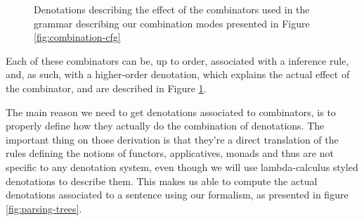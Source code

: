 \begin{figure}
	\centering
	
	\caption{Denotations describing the effect of the combinators used in the
		grammar describing our combination modes presented in
		Figure \ref{fig:combination-cfg}}
	\label{fig:combinator-denotations}
\end{figure}

Each of these combinators can be, up to order, associated with a inference
rule, and, as such, with a higher-order denotation, which explains the actual
effect of the combinator, and are described in
Figure \ref{fig:combinator-denotations}.


The main reason we need to get denotations associated to combinators, is to
properly define how they actually do the combination of denotations.
The important thing on those derivation is that they're a direct translation
of the rules defining the notions of functors, applicatives, monads and thus
are not specific to any denotation system, even though we will use
lambda-calculus styled denotations to describe them.
This makes us able to compute the actual denotations associated to a sentence
using our formalism, as presented in figure \ref{fig:parsing-trees}.


